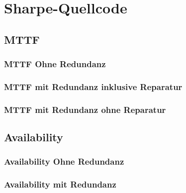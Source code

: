 \documentclass[
            a4paper
            ]{scrartcl}%
\begin{document}
\section{Sharpe-Quellcode}
\subsection{MTTF}
\subsubsection{MTTF Ohne Redundanz}\label{sec:calc_mttf_simple}


\subsubsection{MTTF mit Redundanz inklusive Reparatur}\label{sec:calc_mttf_redundant_rep}


\subsubsection{MTTF mit Redundanz ohne Reparatur}\label{sec:calc_mttf_redundant}

\newpage
\subsection{Availability}
\subsubsection{Availability Ohne Redundanz}\label{sec:calc_aval_simple}


\subsubsection{Availability mit Redundanz}\label{sec:calc_aval_redundant}

\end{document}
